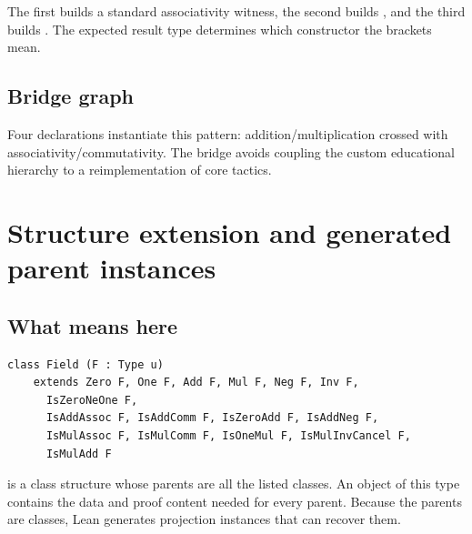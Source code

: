 \documentclass[11pt]{article}
\newcommand{\code}[1]{\texttt{\detokenize{#1}}}
\begin{document}
The first builds a standard associativity witness, the second builds \code{Nonempty F},
and the third builds \code{Sub F}. The expected result type determines which constructor
the brackets mean.

\subsection{Bridge graph}

\begin{center}
\end{center}

Four declarations instantiate this pattern: addition/multiplication crossed with
associativity/commutativity. The bridge avoids coupling the custom educational hierarchy
to a reimplementation of core tactics.

\section{Structure extension and generated parent instances}

\subsection{What \code{extends} means here}

\begin{lstlisting}
class Field (F : Type u)
    extends Zero F, One F, Add F, Mul F, Neg F, Inv F,
      IsZeroNeOne F,
      IsAddAssoc F, IsAddComm F, IsZeroAdd F, IsAddNeg F,
      IsMulAssoc F, IsMulComm F, IsOneMul F, IsMulInvCancel F,
      IsMulAdd F
\end{lstlisting}

\code{Field F} is a class structure whose parents are all the listed classes. An object
of this type contains the data and proof content needed for every parent. Because the
parents are classes, Lean generates projection instances that can recover them.
\end{document}
